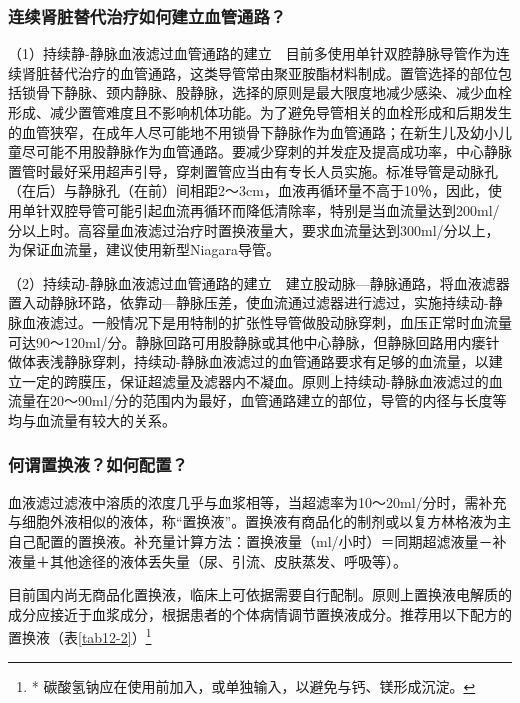 \subsubsection{连续肾脏替代治疗如何建立血管通路？}

（1）持续静-静脉血液滤过血管通路的建立　目前多使用单针双腔静脉导管作为连续肾脏替代治疗的血管通路，这类导管常由聚亚胺酯材料制成。置管选择的部位包括锁骨下静脉、颈内静脉、股静脉，选择的原则是最大限度地减少感染、减少血栓形成、减少置管难度且不影响机体功能。为了避免导管相关的血栓形成和后期发生的血管狭窄，在成年人尽可能地不用锁骨下静脉作为血管通路；在新生儿及幼小儿童尽可能不用股静脉作为血管通路。要减少穿刺的并发症及提高成功率，中心静脉置管时最好采用超声引导，穿刺置管应当由有专长人员实施。标准导管是动脉孔（在后）与静脉孔（在前）间相距2～3cm，血液再循环量不高于10％，因此，使用单针双腔导管可能引起血流再循环而降低清除率，特别是当血流量达到200ml/分以上时。高容量血液滤过治疗时置换液量大，要求血流量达到300ml/分以上，为保证血流量，建议使用新型Niagara导管。

（2）持续动-静脉血液滤过血管通路的建立　建立股动脉---静脉通路，将血液滤器置入动静脉环路，依靠动---静脉压差，使血流通过滤器进行滤过，实施持续动-静脉血液滤过。一般情况下是用特制的扩张性导管做股动脉穿刺，血压正常时血流量可达90～120ml/分。静脉回路可用股静脉或其他中心静脉，但静脉回路用内瘘针做体表浅静脉穿刺，持续动-静脉血液滤过的血管通路要求有足够的血流量，以建立一定的跨膜压，保证超滤量及滤器内不凝血。原则上持续动-静脉血液滤过的血流量在20～90ml/分的范围内为最好，血管通路建立的部位，导管的内径与长度等均与血流量有较大的关系。

\subsubsection{何谓置换液？如何配置？}

血液滤过滤液中溶质的浓度几乎与血浆相等，当超滤率为10～20ml/分时，需补充与细胞外液相似的液体，称“置换液”。置换液有商品化的制剂或以复方林格液为主自己配置的置换液。补充量计算方法：置换液量（ml/小时）＝同期超滤液量－补液量＋其他途径的液体丢失量（尿、引流、皮肤蒸发、呼吸等）。

目前国内尚无商品化置换液，临床上可依据需要自行配制。原则上置换液电解质的成分应接近于血浆成分，根据患者的个体病情调节置换液成分。推荐用以下配方的置换液（表\ref{tab12-2}）\footnote{* 碳酸氢钠应在使用前加入，或单独输入，以避免与钙、镁形成沉淀。}

